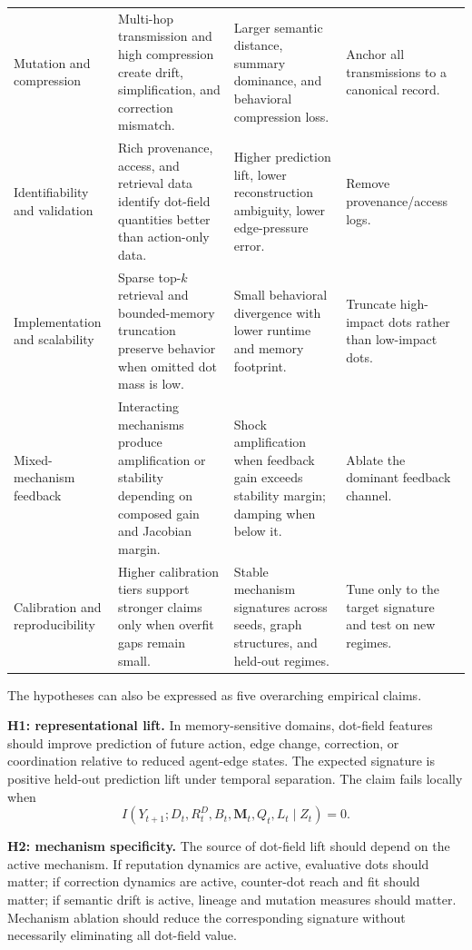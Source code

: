 \documentclass[11pt]{article}
\theoremstyle{remark}
\begin{document}
\begin{longtable}[]{@{}L{0.20\textwidth}L{0.33\textwidth}L{0.27\textwidth}L{0.15\textwidth}@{}}
Mutation and compression & Multi-hop transmission and high compression create drift, simplification, and correction mismatch. & Larger semantic distance, summary dominance, and behavioral compression loss. & Anchor all transmissions to a canonical record.\\
Identifiability and validation & Rich provenance, access, and retrieval data identify dot-field quantities better than action-only data. & Higher prediction lift, lower reconstruction ambiguity, lower edge-pressure error. & Remove provenance/access logs.\\
Implementation and scalability & Sparse top-$k$ retrieval and bounded-memory truncation preserve behavior when omitted dot mass is low. & Small behavioral divergence with lower runtime and memory footprint. & Truncate high-impact dots rather than low-impact dots.\\
Mixed-mechanism feedback & Interacting mechanisms produce amplification or stability depending on composed gain and Jacobian margin. & Shock amplification when feedback gain exceeds stability margin; damping when below it. & Ablate the dominant feedback channel.\\
Calibration and reproducibility & Higher calibration tiers support stronger claims only when overfit gaps remain small. & Stable mechanism signatures across seeds, graph structures, and held-out regimes. & Tune only to the target signature and test on new regimes.\\
\bottomrule
\end{longtable}

The hypotheses can also be expressed as five overarching empirical claims.

\textbf{H1: representational lift.} In memory-sensitive domains, dot-field features should improve prediction of future action, edge change, correction, or coordination relative to reduced agent-edge states. The expected signature is positive held-out prediction lift under temporal separation. The claim fails locally when
\[
I(Y_{t+1};D_t,R_t^D,B_t,\mathbf M_t,Q_t,L_t\mid Z_t)=0.
\]

\textbf{H2: mechanism specificity.} The source of dot-field lift should depend on the active mechanism. If reputation dynamics are active, evaluative dots should matter; if correction dynamics are active, counter-dot reach and fit should matter; if semantic drift is active, lineage and mutation measures should matter. Mechanism ablation should reduce the corresponding signature without necessarily eliminating all dot-field value.
\end{document}
